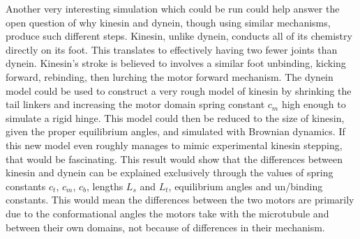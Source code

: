\documentclass[
11pt, %
english, %
singlespacing, %
headsepline, %
chapterinoneline, %
]{MastersDoctoralThesis} %
\begin{document}
Another very interesting simulation which could be run could help answer the open question of why kinesin and dynein, though using similar mechanisms, produce such different steps. Kinesin, unlike dynein, conducts all of its chemistry directly on its foot. This translates to effectively having two fewer joints than dynein. Kinesin's stroke is believed to involves a similar foot unbinding, kicking forward, rebinding, then lurching the motor forward mechanism. The dynein model could be used to construct a very rough model of kinesin by shrinking the tail linkers and increasing the motor domain spring constant $c_m$ high enough to simulate a rigid hinge. This model could then be reduced to the size of kinesin, given the proper equilibrium angles, and simulated with Brownian dynamics. If this new model even roughly manages to mimic experimental kinesin stepping, that would be fascinating. This result would show that the differences between kinesin and dynein can be explained exclusively through the values of spring constants $c_t$, $c_m$, $c_b$, lengths $L_s$ and $L_t$, equilibrium angles and un/binding constants. This would mean the differences between the two motors are primarily due to the conformational angles the motors take with the microtubule and between their own domains, not because of differences in their mechanism.\\
\end{document}
